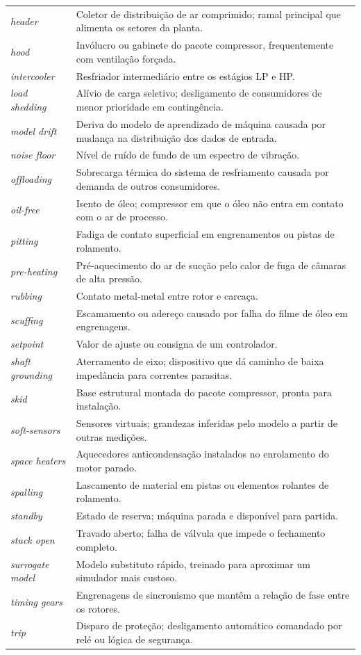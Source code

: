 \documentclass[12pt,a4paper]{article}
\numberwithin{equation}{section}
\numberwithin{table}{section}
\numberwithin{figure}{section}
\begin{document}
\begin{longtable}{p{4.0cm} p{10.0cm}}
\textit{header} & Coletor de distribuição de ar comprimido; ramal principal que alimenta os setores da planta. \\
\textit{hood} & Invólucro ou gabinete do pacote compressor, frequentemente com ventilação forçada. \\
\textit{intercooler} & Resfriador intermediário entre os estágios LP e HP. \\
\textit{load shedding} & Alívio de carga seletivo; desligamento de consumidores de menor prioridade em contingência. \\
\textit{model drift} & Deriva do modelo de aprendizado de máquina causada por mudança na distribuição dos dados de entrada. \\
\textit{noise floor} & Nível de ruído de fundo de um espectro de vibração. \\
\textit{offloading} & Sobrecarga térmica do sistema de resfriamento causada por demanda de outros consumidores. \\
\textit{oil-free} & Isento de óleo; compressor em que o óleo não entra em contato com o ar de processo. \\
\textit{pitting} & Fadiga de contato superficial em engrenamentos ou pistas de rolamento. \\
\textit{pre-heating} & Pré-aquecimento do ar de sucção pelo calor de fuga de câmaras de alta pressão. \\
\textit{rubbing} & Contato metal-metal entre rotor e carcaça. \\
\textit{scuffing} & Escamamento ou adereço causado por falha do filme de óleo em engrenagens. \\
\textit{setpoint} & Valor de ajuste ou consigna de um controlador. \\
\textit{shaft grounding} & Aterramento de eixo; dispositivo que dá caminho de baixa impedância para correntes parasitas. \\
\textit{skid} & Base estrutural montada do pacote compressor, pronta para instalação. \\
\textit{soft-sensors} & Sensores virtuais; grandezas inferidas pelo modelo a partir de outras medições. \\
\textit{space heaters} & Aquecedores anticondensação instalados no enrolamento do motor parado. \\
\textit{spalling} & Lascamento de material em pistas ou elementos rolantes de rolamento. \\
\textit{standby} & Estado de reserva; máquina parada e disponível para partida. \\
\textit{stuck open} & Travado aberto; falha de válvula que impede o fechamento completo. \\
\textit{surrogate model} & Modelo substituto rápido, treinado para aproximar um simulador mais custoso. \\
\textit{timing gears} & Engrenagens de sincronismo que mantêm a relação de fase entre os rotores. \\
\textit{trip} & Disparo de proteção; desligamento automático comandado por relé ou lógica de segurança. \\
\bottomrule
\end{longtable}
\end{document}
